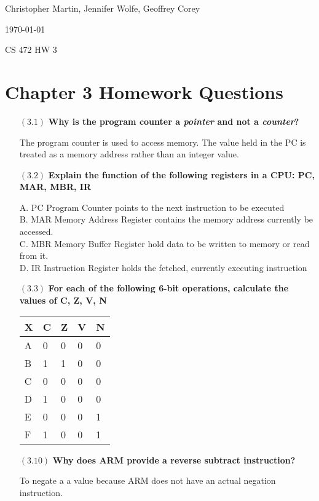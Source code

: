 \documentclass[letterpaper,10pt,titlepage]{article}
\def\name{Christopher Martin, Jennifer Wolfe, Geoffrey Corey}
\begin{document}
\hfill \name

\hfill \today

\hfill CS 472 HW 3

\section*{Chapter 3 Homework Questions}


\begin{enumerate}
\item[$(3.1)$] \textbf{Why is the program counter a \textit{pointer} and not a \textit{counter}?}

  The program counter is used to access memory. The value held in the PC is treated as a memory address rather than an integer value.   

\item[$(3.2)$] \textbf{Explain the function of the following registers in a CPU: PC, MAR, MBR, IR}

A. PC Program Counter points to the next instruction to be executed\\
B. MAR Memory Address Register contains the memory address currently be accessed. \\
C. MBR Memory Buffer Register hold data to be written to memory or read from it.\\
D. IR Instruction Register holds the fetched, currently executing instruction
  
\item[$(3.3)$] \textbf{For each of the following 6-bit operations, calculate the values of C, Z, V, N}

\begin{tabular}{| l | l | l | l | l |}
	\hline
	X & C & Z & V & N \\ \hline
	A & 0 & 0 & 0 & 0 \\ \hline
	B & 1 & 1 & 0 & 0 \\ \hline
	C & 0 & 0 & 0 & 0 \\ \hline
	D & 1 & 0 & 0 & 0 \\ \hline 
	E & 0 & 0 & 0 & 1 \\ \hline 
	F & 1 & 0 & 0 & 1 \\ \hline 
	\end{tabular}

  
\item[$(3.10)$] \textbf{Why does ARM provide a reverse subtract instruction?}

To negate a a value because ARM does not have an actual negation instruction.


\end{enumerate}
\end{document}
